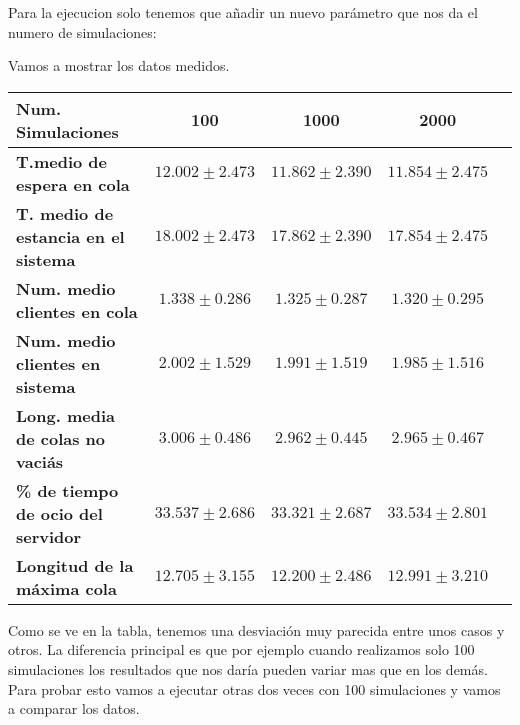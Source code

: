 \documentclass[]{article}
\begin{document}
Para la ejecucion solo tenemos que añadir un nuevo parámetro que nos da el numero de simulaciones:

\scalebox{0.8}{%
$./colammk <numeroServidores> <tiempoParada> <tlleg> <tserv> <numRepeticiones>$}

Vamos a mostrar los datos medidos.
\begin{table}[H]
	\begin{center}
		\begin{tabularx}{1\textwidth}{|X|c|c|c|c|}
			\hline
			\textbf{Num. Simulaciones} &  100 & 1000 & 2000\\
			\hline \hline
			\textbf{T.medio de espera en cola}& $12.002\pm2.473$ & $11.862\pm2.390$ & $11.854\pm2.475$ \\ \hline
			\textbf{T. medio de estancia en el sistema}& $18.002\pm2.473$ & $17.862\pm2.390$ & $17.854\pm2.475$ \\ \hline
			\textbf{Num. medio clientes en cola}& $1.338\pm0.286$ & $1.325\pm0.287$& $1.320\pm0.295$ \\  \hline
			\textbf{Num. medio clientes en sistema}& $2.002\pm1.529$ & $1.991\pm1.519$& $1.985\pm1.516$ \\ \hline
			\textbf{Long. media de colas no vaciás}& $3.006\pm0.486$ & $2.962\pm0.445$& $2.965\pm0.467$ \\ \hline
			\textbf{\% de tiempo de ocio del servidor}& $33.537\pm2.686$ & $33.321\pm2.687$& $33.534\pm2.801$ \\ \hline
			\textbf{Longitud de la máxima cola}& $12.705\pm3.155$  &$12.200\pm2.486$& $12.991\pm3.210$ \\ \hline
		\end{tabularx}
		
	\end{center}
\end{table}
Como se ve en la tabla, tenemos una desviación muy parecida entre unos casos y otros. La diferencia principal es que por ejemplo cuando realizamos solo 100 simulaciones los resultados que nos daría pueden variar mas que en los demás. Para probar esto vamos a ejecutar otras dos veces con 100 simulaciones y vamos a comparar los datos.
\end{document}
